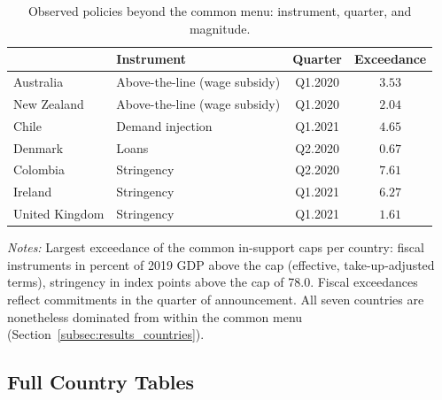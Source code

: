 \documentclass[12pt, a4paper]{article}
\begin{document}
\begin{table}[H]
\centering
\scriptsize
\caption{Observed policies beyond the common menu: instrument, quarter, and magnitude.}
\label{tab:country_exceedance}
\begin{tabular}{llcc}
\toprule
 & \textbf{Instrument} & \textbf{Quarter} & \textbf{Exceedance} \\
\midrule
Australia      & Above-the-line (wage subsidy) & Q1.2020 & $3.53$ \\
New Zealand    & Above-the-line (wage subsidy) & Q1.2020 & $2.04$ \\
Chile          & Demand injection              & Q1.2021 & $4.65$ \\
Denmark        & Loans                         & Q2.2020 & $0.67$ \\
Colombia       & Stringency                    & Q2.2020 & $7.61$ \\
Ireland        & Stringency                    & Q1.2021 & $6.27$ \\
United Kingdom & Stringency                    & Q1.2021 & $1.61$ \\
\bottomrule
\end{tabular}
\vspace{0.15cm}
\begin{minipage}{0.9\textwidth}
\scriptsize \textit{Notes:} Largest exceedance of the common in-support caps
per country: fiscal instruments in percent of 2019 GDP above the cap
(effective, take-up-adjusted terms), stringency in index points above the
cap of 78.0. Fiscal exceedances reflect commitments in the quarter of
announcement. All seven countries are nonetheless dominated from within the
common menu (Section~\ref{subsec:results_countries}).
\end{minipage}
\end{table}

\subsection{Full Country Tables}
\label{app:country_tables}
\end{document}
